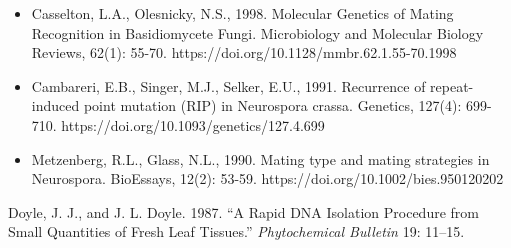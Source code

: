 \documentclass[
  letterpaper,
  DIV=11,
  numbers=noendperiod]{scrreprt}
\newlength{\cslhangindent}
\newenvironment{CSLReferences}[2] %
 {\begin{list}{}{%
  \setlength{\itemindent}{0pt}
  \setlength{\leftmargin}{0pt}
  \setlength{\parsep}{0pt}
  \ifodd #1
   \setlength{\leftmargin}{\cslhangindent}
   \setlength{\itemindent}{-1\cslhangindent}
  \fi
  \setlength{\itemsep}{#2\baselineskip}}}
 {\end{list}}
\providecommand{\tightlist}{%
  \setlength{\itemsep}{0pt}\setlength{\parskip}{0pt}}
\begin{document}
\begin{itemize}
\tightlist
\item
  Casselton, L.A., Olesnicky, N.S., 1998. Molecular Genetics of Mating
  Recognition in Basidiomycete Fungi. Microbiology and Molecular Biology
  Reviews, 62(1): 55-70. https://doi.org/10.1128/mmbr.62.1.55-70.1998
\item
  Cambareri, E.B., Singer, M.J., Selker, E.U., 1991. Recurrence of
  repeat-induced point mutation (RIP) in Neurospora crassa. Genetics,
  127(4): 699-710. https://doi.org/10.1093/genetics/127.4.699
\item
  Metzenberg, R.L., Glass, N.L., 1990. Mating type and mating strategies
  in Neurospora. BioEssays, 12(2): 53-59.
  https://doi.org/10.1002/bies.950120202
\end{itemize}

\protect{}\label{refs}
\begin{CSLReferences}{1}{1}
Doyle, J. J., and J. L. Doyle. 1987. {``A Rapid {DNA} Isolation
Procedure from Small Quantities of Fresh Leaf Tissues.''}
\emph{Phytochemical Bulletin} 19: 11--15.

\end{CSLReferences}
\end{document}
